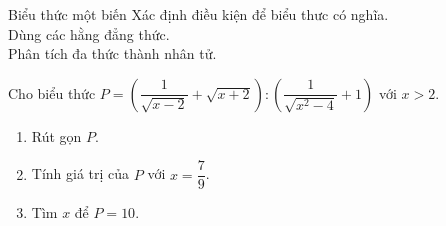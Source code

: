 \begin{dang}{Biểu thức một biến}
	Xác định điều kiện để biểu thưc có nghĩa.\\
    Dùng các hằng đẳng thức. \\
    Phân tích đa thức thành nhân tử.
\end{dang}
    \begin{vd}%
        Cho biểu thức $P= \left( \dfrac{1}{\sqrt{x-2}} + \sqrt{x+2} \right) \colon \left( \dfrac{1}{\sqrt{x^2-4}} +1 \right)$ với $x > 2$.
        \begin{enumerate}
        	\item Rút gọn $P$.
        	\item Tính giá trị của $P$ với $x= \dfrac{7}{9}$.
        	\item Tìm $x$ để $P=10$.
        \end{enumerate}
    \end{vd}
